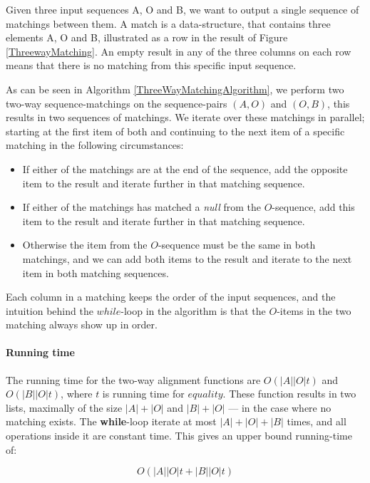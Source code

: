 \documentclass[11pt]{article}
\begin{document}
Given three input sequences A, O and B, we want to output a single sequence of matchings between them. A match is a data-structure, that contains three elements A, O and B, illustrated as a row in the result of Figure \ref{ThreewayMatching}. An empty result in any of the three columns on each row means that there is no matching from this specific input sequence.

As can be seen in Algorithm \ref{ThreeWayMatchingAlgorithm}, we perform two two-way sequence-matchings on the sequence-pairs $(A, O)$ and $(O, B)$, this results in two sequences of matchings.  We iterate over these matchings in parallel; starting at the first item of both and continuing to the next item of a specific matching in the following circumstances:

\begin{itemize}
	\item If either of the matchings are at the end of the sequence, add the opposite item to the result and iterate further in that matching sequence.
	\item If either of the matchings has matched a \textit{null} from the $O$-sequence, add this item to the result and iterate further in that matching sequence.
	\item Otherwise the item from the $O$-sequence must be the same in both matchings, and we can add both items to the result and iterate to the next item in both matching sequences.
\end{itemize}

Each column in a matching keeps the order of the input sequences, and the intuition behind the $while$-loop in the algorithm is that the $O$-items in the two matching always show up in order.

\paragraph{Running time} The running time for the two-way alignment functions are $O(|A||O|t)$ and $O(|B||O|t)$, where $t$ is running time for $equality$. These function results in two lists, maximally of the size $|A|+|O|$ and $|B|+|O|$ --- in the case where no matching exists. The \textbf{while}-loop iterate at most $|A|+|O|+|B|$ times, and all operations inside it are constant time. This gives an upper bound running-time of:

\begin{equation}
	O(|A||O| t + |B||O| t ) \nonumber
\end{equation}  
\end{document}
